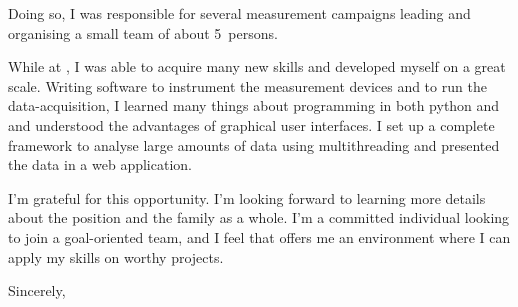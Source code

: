 \documentclass[12pt]{extarticle}
\begin{document}
Doing so, I was responsible for several measurement campaigns leading and organising a small team of about \SI{5}{persons}.\par
%
While at \@oldcomp, I was able to acquire many new skills and developed myself on a great scale.
Writing software to instrument the measurement devices and to run the data-acquisition, I learned many things about programming in both python and \cpp and understood the advantages of graphical user interfaces.
I set up a complete framework to analyse large amounts of data using multithreading and presented the data in a web application.\par
%
I'm grateful for this opportunity.
I'm looking forward to learning more details about the \@position position and the \@company family as a whole.
I'm a committed individual looking to join a goal-oriented team, and I feel that \@company offers me an environment where I can apply my skills on worthy projects.\par
%
Sincerely,\par
%
\@author
%
\end{document}
